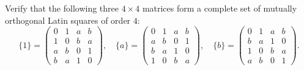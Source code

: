 Verify that the following three $4 \times 4$ matrices form a complete set of mutually orthogonal Latin squares of order $4$:
$$
\{1\} = \begin{pmatrix}
0 & 1 & a & b \\
1 & 0 & b & a \\
a & b & 0 & 1 \\
b & a & 1 & 0
\end{pmatrix}, \quad
\{a\} = \begin{pmatrix}
0 & 1 & a & b \\
a & b & 0 & 1 \\
b & a & 1 & 0 \\
1 & 0 & b & a
\end{pmatrix}, \quad
\{b\} = \begin{pmatrix}
0 & 1 & a & b \\
b & a & 1 & 0 \\
1 & 0 & b & a \\
a & b & 0 & 1
\end{pmatrix}.
$$
